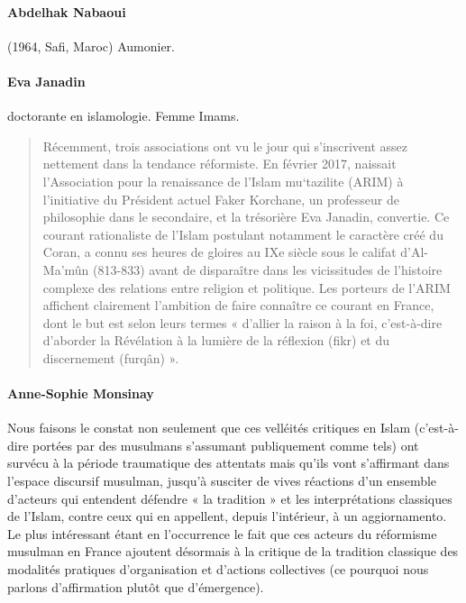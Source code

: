 \paragraph{Abdelhak Nabaoui} (1964, Safi, Maroc) Aumonier.
\paragraph{Eva Janadin} doctorante en islamologie. Femme Imams.
\begin{quote}
    Récemment, trois associations ont vu le jour qui s’inscrivent assez nettement dans la tendance réformiste. En février 2017, naissait l’Association pour la renaissance de l’Islam mu‘tazilite (ARIM) à l’initiative du Président actuel Faker Korchane, un professeur de philosophie dans le secondaire, et la trésorière Eva Janadin, convertie. Ce courant rationaliste de l’Islam postulant notamment le caractère créé du Coran, a connu ses heures de gloires au IXe siècle sous le califat d’Al-Ma’mûn (813-833) avant de disparaître dans les vicissitudes de l’histoire complexe des relations entre religion et politique. Les porteurs de l’ARIM affichent clairement l’ambition de faire connaître ce courant en France, dont le but est selon leurs termes « d’allier la raison à la foi, c’est-à-dire d’aborder la Révélation à la lumière de la réflexion (fikr) et du discernement (furqân) ». \cite{Baylocq:reformisteFrance}
\end{quote}

\paragraph{Anne-Sophie Monsinay}


\begin{Synthesis}
Nous faisons le constat non seulement que ces velléités critiques en Islam (c’est-à-dire portées par des musulmans s’assumant publiquement comme tels) ont survécu à la période traumatique des attentats mais qu’ils vont s’affirmant dans l’espace discursif musulman, jusqu’à susciter de vives réactions d’un ensemble d’acteurs qui entendent défendre « la tradition » et les interprétations classiques de l’Islam, contre ceux qui en appellent, depuis l’intérieur, à un aggiornamento. Le plus intéressant étant en l’occurrence le fait que ces acteurs du réformisme musulman en France ajoutent désormais à la critique de la tradition classique des modalités pratiques d’organisation et d’actions collectives (ce pourquoi nous parlons d’affirmation plutôt que d’émergence). 
\end{Synthesis}

